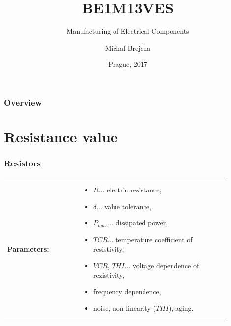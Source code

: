\documentclass{beamer}
\title[BE1M13VES]{BE1M13VES}
\subtitle[Manufacturing of Electrical Components] {Manufacturing of Electrical Components}
\author[Brejcha]{Michal Brejcha}
\institute[CTU]{CTU in Prague}
\date[Prague, 2017]{Prague, 2017}
\begin{document}
\frame{\titlepage}

\begin{frame}
\frametitle{Overview} 
\tableofcontents
\end{frame}


\section{\texorpdfstring{Resistance value}{Resistance value}}
	\begin{frame}
    \frametitle{Resistors}
		\begin{center}
		\begin{tabular}{p{0.3\linewidth} p{0.6\linewidth}}
			\textbf{Parameters:} 					& 
			\begin{itemize}
				\item $R$... electric resistance,
				\item $\delta$... value tolerance,
				\item $P_{max}$... dissipated power,
				\item $TCR$... temperature coefficient of resistivity,
				\item $VCR$, $THI$... voltage dependence of rezistivity,
				\item frequency dependence,
				\item noise, non-linearity ($THI$), aging.
			\end{itemize}
			\\

		\end{tabular}
		\end{center}
  \end{frame}
\end{document}
